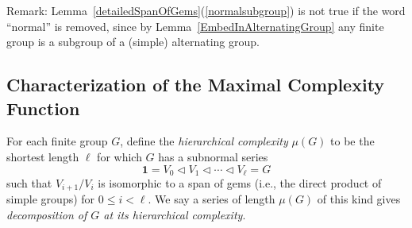 \documentclass[a4paper,11pt]{amsart}
\theoremstyle{definition}
\newcommand{\1}{{\mathbf 1}}
\begin{document}
Remark:  Lemma~\ref{detailedSpanOfGems}(\ref{normalsubgroup})  is not true if the word ``normal'' is removed, since by Lemma~\ref{EmbedInAlternatingGroup} any finite group is a subgroup of a (simple) alternating group.\\[1ex]
 
\subsection{Characterization of the Maximal Complexity Function}\label{sec-mu-complexity}
For each finite group $G$, define the {\em hierarchical complexity} $\mu(G)$ to be the shortest length $\ell$ for which $G$ has a subnormal series 
\begin{equation*}
   \1 =V_0 \lhd V_1 \lhd \cdots \lhd V_{\ell} =G \tag{$\star$}
\end{equation*}
such that $V_{i+1}/V_i$ is isomorphic to a span of gems (i.e.,  the direct product of simple groups) for $0\leq i < \ell$.
We say a series of length $\mu(G)$ of this kind gives 
{\em decomposition of $G$ at its hierarchical complexity}.
\end{document}
